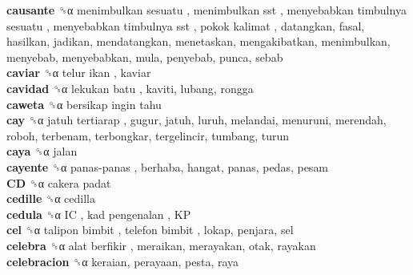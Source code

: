 \textbf{causante} ␝α   menimbulkan sesuatu ,  menimbulkan sst ,  menyebabkan timbulnya sesuatu ,  menyebabkan timbulnya sst ,  pokok kalimat , datangkan, fasal, hasilkan, jadikan, mendatangkan, menetaskan, mengakibatkan, menimbulkan, menyebab, menyebabkan, mula, penyebab, punca, sebab  \\
\textbf{caviar} ␝α   telur ikan , kaviar  \\
\textbf{cavidad} ␝α   lekukan batu , kaviti, lubang, rongga  \\
\textbf{caweta} ␝α   bersikap ingin tahu   \\
\textbf{cay} ␝α   jatuh tertiarap , gugur, jatuh, luruh, melandai, menuruni, merendah, roboh, terbenam, terbongkar, tergelincir, tumbang, turun  \\
\textbf{caya} ␝α  jalan  \\
\textbf{cayente} ␝α   panas-panas , berhaba, hangat, panas, pedas, pesam  \\
\textbf{CD} ␝α   cakera padat   \\
\textbf{cedille} ␝α  cedilla  \\
\textbf{cedula} ␝α   IC ,  kad pengenalan ,  KP   \\
\textbf{cel} ␝α   talipon bimbit ,  telefon bimbit , lokap, penjara, sel  \\
\textbf{celebra} ␝α   alat berfikir , meraikan, merayakan, otak, rayakan  \\
\textbf{celebracion} ␝α  keraian, perayaan, pesta, raya  \\
